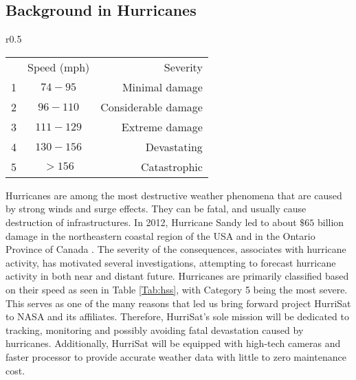 \subsection{Background in Hurricanes}
    \begin{wraptable}{r}{0.5\textwidth}
    \centering
    \begin{tabular}{ccr}
    \rowcolor{gray!50}{Category & Speed (mph) & Severity}\\
    \cellcolor{red!20} 1  & { $74-95$} & {\small Minimal damage}\\
    \cellcolor{red!40} 2  & { $96-110$} & {\small Considerable damage}\\
    \cellcolor{red!60} 3 & { $111-129$} & {\small Extreme damage}\\
    \cellcolor{red!80} 4 & { $130-156$} & {\small Devastating}\\
    \cellcolor{red} 5 & { $>156$} & {\small Catastrophic}\\
    \end{tabular}
    \caption{\small Hurricane Severity}
    \label{Tab:hss}
\end{wraptable} 
    Hurricanes are among the most destructive weather phenomena that are caused by strong winds and surge effects. They can be fatal, and usually cause destruction of infrastructures. In 2012, Hurricane Sandy led to about $\$65$ billion damage in the northeastern coastal region of the USA and in the Ontario Province of Canada \cite{Cui2016}. The severity of the consequences, associates with hurricane activity, has motivated several investigations, attempting to forecast hurricane activity in both near and distant future. Hurricanes are primarily classified based on their speed as seen in Table \ref{Tab:hss}, with Category 5 being the most severe. This serves as one of the many reasons that led us bring forward project HurriSat to NASA and its affiliates. Therefore, HurriSat's sole mission will be dedicated to tracking, monitoring and possibly avoiding fatal devastation caused by hurricanes. Additionally, HurriSat will be equipped with high-tech cameras and faster processor to provide accurate weather data with little to zero maintenance cost.

